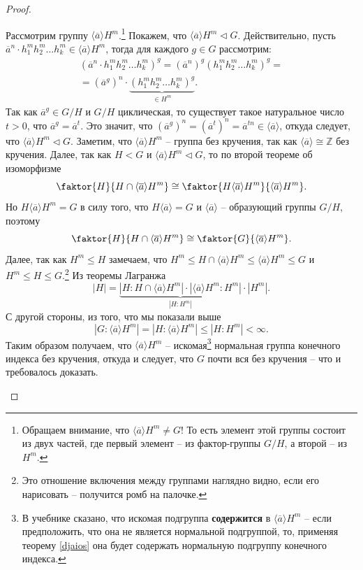 \documentclass{article}
\begin{document}
\begin{proof}
\begin{enumerate}
        Рассмотрим группу $\langle \overline{a} \rangle H^m$.\footnote{Обращаем внимание, что $\langle \overline{a} \rangle H^m \neq G$! То есть элемент этой группы состоит из двух частей, где первый элемент -- из фактор-группы $G /H$, а второй -- из $H^m$.} Покажем, что $\langle \overline{a} \rangle H^m \triangleleft G$. Действительно, пусть $\overline{a}^n \cdot h_1^m h_2^m \ldots h_k^m \in \langle \overline{a} \rangle H^m$, тогда для каждого $g \in G$ рассмотрим:
        \begin{gather*}
            (\overline{a}^n \cdot h_1^m h_2^m \ldots h_k^m)^g = (\overline{a}^n)^g (h_1^m h_2^m \ldots h_k^m)^g = \\
            = (\overline{a}^g)^n \cdot \underbrace{(h_1^m h_2^m \ldots h_k^m)^g}_{\in H^m}.
        \end{gather*}
        Так как $\overline{a}^g \in G / H$ и $G/H$ циклическая, то существует такое натуральное число $t > 0$, что $ \overline{a}^g = \overline{a}^t$. Это значит, что $(\overline{a}^g)^n = (\overline{a}^t)^n = \overline{a}^{tn} \in \langle \overline{a} \rangle$, откуда следует, что $\langle \overline{a} \rangle H^m \triangleleft G$. Заметим, что $\langle \overline{a} \rangle H^m$ -- группа без кручения, так как $\langle \overline{a} \rangle \cong \mathbb{Z}$ без кручения.
        Далее, так как $H < G$ и $\langle \overline{a} \rangle H^m \triangleleft G$, то по второй теореме об изоморфизме
        \[
            \faktor{H}{H \cap \langle \overline{a} \rangle H^m} \cong \faktor{H \langle \overline{a} \rangle H^m}{\langle \overline{a} \rangle H^m}.
        \]
        Но $H \langle \overline{a} \rangle H^m = G$ в силу того, что $H \langle \overline{a} \rangle = G$ и $\langle \overline{a} \rangle$ -- образующий группы $G/H$, поэтому
        \[
            \faktor{H}{H \cap \langle \overline{a} \rangle H^m} \cong \faktor{G}{\langle \overline{a} \rangle H^m}.
        \]
        Далее, так как $H^m \leqslant H$ замечаем, что $H^m \leqslant H \cap \langle \overline{a} \rangle H^m \leqslant \langle \overline{a} \rangle H^m \leqslant G$ и $H^m \leqslant H \leqslant G$.\footnote{Это отношение включения между группами наглядно видно, если его нарисовать -- получится ромб на палочке.} Из теоремы Лагранжа $$ |H| = \underbrace{|H:H \cap \langle \overline{a} \rangle H^m | \cdot | \langle \overline{a} \rangle H^m: H^m|}_{|H : H^m|} \cdot |H^m|. $$
        С другой стороны, из того, что мы показали выше $$ |G:\langle \overline{a} \rangle H^m| = |H : \langle \overline{a} \rangle H^m| \leqslant |H:H^m| < \infty. $$
        Таким образом получаем, что $\langle \overline{a} \rangle H^m$ -- искомая\footnote{В учебнике сказано, что искомая подгруппа \textbf{содержится} в $ \langle \overline{a} \rangle H^m$ -- если предположить, что она не является нормальной подгруппой, то, применяя теорему \ref{djaios} она будет содержать нормальную подгруппу конечного индекса.} нормальная группа конечного индекса без кручения, откуда и следует, что $G$ почти вся без кручения -- что и требовалось доказать.
    \end{enumerate}
\end{proof}
\end{document}
